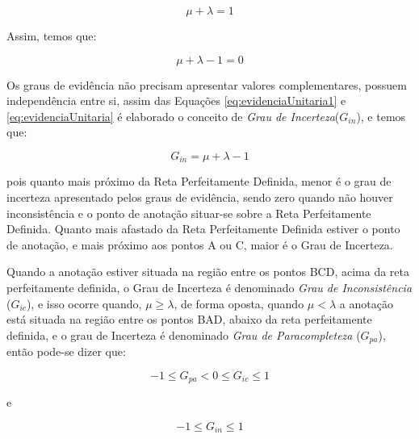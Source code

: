 \begin{center}
\begin{equation}
\mu + \lambda = 1
\label{eq:evidenciaUnitaria1}
\end{equation}
\end{center}

Assim, temos que:

\begin{center}
\begin{equation}
\mu + \lambda - 1 = 0
\label{eq:evidenciaUnitaria}
\end{equation}
\end{center}


Os graus de evidência não precisam apresentar valores complementares, possuem independência entre si, assim das Equações  
\ref{eq:evidenciaUnitaria1} e 
\ref{eq:evidenciaUnitaria} 
é elaborado o conceito de 
\emph{Grau de Incerteza}($G_{in}$), 
e temos que: 


\begin{center}
\begin{equation}
G_{in} = \mu + \lambda - 1
\label{eq:grauContradicao}
\end{equation}
\end{center}

pois quanto mais próximo da Reta Perfeitamente Definida, menor é o grau de incerteza apresentado pelos graus de evidência, sendo zero quando não houver inconsistência e o ponto de anotação situar-se sobre a Reta Perfeitamente Definida. 
Quanto mais afastado da Reta Perfeitamente Definida estiver o ponto de anotação, e mais próximo aos pontos A ou C, maior é o Grau de Incerteza. 

Quando a anotação estiver situada na região entre os pontos BCD, acima da reta perfeitamente definida, o Grau de Incerteza é denominado 
\emph{Grau de Inconsistência} ($G_{ic}$), 
e isso ocorre quando, $\mu \ge \lambda $, de forma oposta, quando $\mu < \lambda $ a anotação está situada na região entre os pontos BAD, abaixo da reta perfeitamente definida, e o grau de Incerteza é denominado 
\emph{Grau de Paracompleteza} ($G_{pa}$), 
então pode-se dizer que:


\begin{center}
\begin{equation}
-1 \le G _{pa}  <  0 \le G _{ic} \le 1
\label{eq:grauInconsistenciaIndefinicao}
\end{equation}
\end{center}
e
\begin{center}
\begin{equation}
-1 \le G _{in} \le 1
\label{eq:grauInconsistenciaIndefinicao1}
\end{equation}
\end{center}


